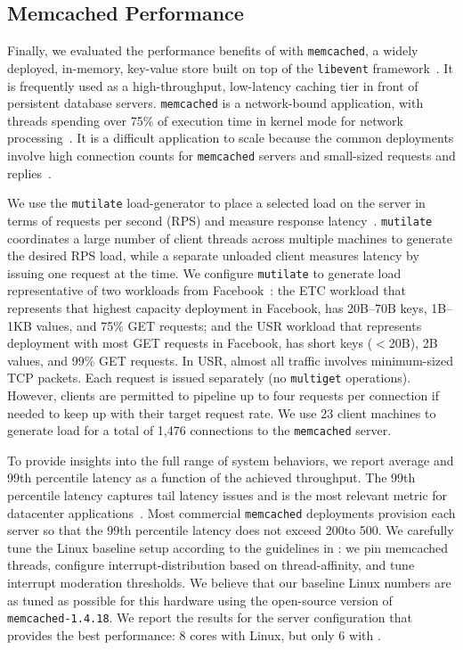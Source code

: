 

\subsection{Memcached Performance}
\label{sec:eval:memcached}




Finally, we evaluated the performance benefits of \ix with
\texttt{memcached}, a widely deployed, in-memory, key-value store built
on top of the \texttt{libevent} framework~\cite{url:memcached}. It is
frequently used as a high-throughput, low-latency caching tier in
front of persistent database servers. \texttt{memcached} is a
network-bound application, with threads spending over 75\% of
execution time in kernel mode for network
processing~\cite{DBLP:conf/eurosys/LeverichK14}. It is a difficult
application to scale because the common deployments involve high
connection counts for \texttt{memcached} servers and small-sized
requests and
replies~\cite{Atikoglu:2012:WAL,DBLP:conf/nsdi/NishtalaFGKLLMPPSSTV13}.



We use the \texttt{mutilate} load-generator to place a selected load
on the server in terms of requests per second (RPS) and measure
response latency~\cite{url:mutilate}. \texttt{mutilate} coordinates a
large number of client threads across multiple machines to generate
the desired RPS load, while a separate unloaded client measures
latency by issuing one request at the time.  We configure
\texttt{mutilate} to generate load representative of two workloads
from Facebook~\cite{Atikoglu:2012:WAL}: the ETC workload that
represents that highest capacity deployment in Facebook, has 20B--70B
keys, 1B--1KB values, and 75\% GET requests; and the USR workload that
represents deployment with most GET requests in Facebook, has short
keys ($<$20B), 2B values, and 99\% GET requests. In USR, almost all
traffic involves minimum-sized TCP packets. Each request is issued
separately (no \texttt{multiget} operations). However, clients
are permitted to pipeline up to four requests per connection
if needed to keep up with their target request rate. We use 23
client machines to generate load for a total of
1,476 connections to the \texttt{memcached} server.

To provide insights into the full range of system behaviors, we report
average and 99th percentile latency as a function of the achieved
throughput. The 99th percentile latency captures tail latency issues and is
the most relevant metric for datacenter
applications~\cite{DBLP:journals/cacm/DeanB13}. Most commercial
\texttt{memcached} deployments provision each server so that the
99th percentile latency does not exceed 200\microsecond to 500\microsecond.
We carefully tune the Linux baseline setup according to the guidelines
in \cite{DBLP:conf/eurosys/LeverichK14}: we pin memcached threads,
configure interrupt-distribution based on thread-affinity, and tune
interrupt moderation thresholds. We believe that our baseline Linux
numbers are as tuned as possible for this hardware using the
open-source version of \texttt{memcached-1.4.18}. We report the
results for the server configuration that provides the best
performance: 8 cores with Linux, but only 6 with \ix.

